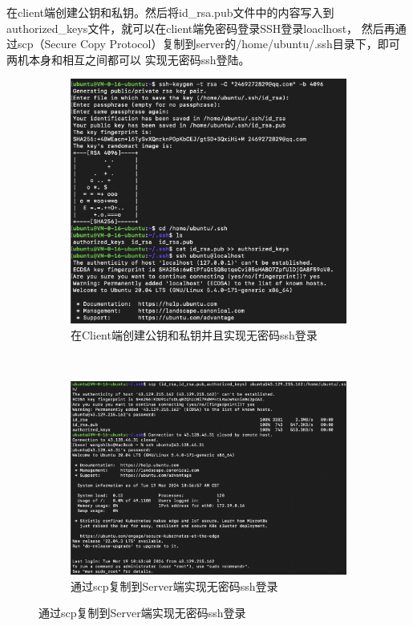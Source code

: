 \documentclass{article}
\begin{document}
在client端创建公钥和私钥。然后将id\_rsa.pub文件中的内容写入到authorized\_keys文件，就可以在client端免密码登录SSH登录loaclhost，
然后再通过scp（Secure Copy Protocol）复制到server的/home/ubuntu/.ssh目录下，即可两机本身和相互之间都可以
实现无密码ssh登陆。
\begin{figure}[ht]
    \centering
    \begin{subfigure}[b]{0.4\textwidth} 
        \centering
        \includegraphics[width=\textwidth]{client_login_ssh.png} 
        \caption{在Client端创建公钥和私钥并且实现无密码ssh登录}
    \end{subfigure}
    ~
    \begin{subfigure}[b]{0.4\textwidth}
        \centering
        \includegraphics[width=\textwidth]{scp_ssh_without_pwd.png}
        \caption{通过scp复制到Server端实现无密码ssh登录}
    \end{subfigure}
\end{figure}
\end{document}
